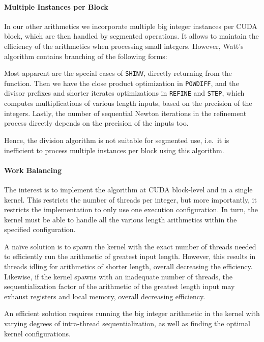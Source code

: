 \paragraph{Multiple Instances per Block}
In our other arithmetics we incorporate multiple big integer instances per CUDA
block, which are then handled by segmented operations. It allows to maintain the
efficiency of the arithmetics when processing small integers. However, Watt's
algorithm contains branching of the following forms:

Most apparent are the special cases of \texttt{SHINV}, directly returning from
the function. Then we have the close product optimization in \texttt{POWDIFF},
and the divisor prefixes and shorter iterates optimizations in \texttt{REFINE}
and \texttt{STEP}, which computes multiplications of various length inputs,
based on the precision of the integers. Lastly, the number of sequential Newton
iterations in the refinement process directly depends on the precision of the
inputs too.

Hence, the division algorithm is not suitable for segmented use, i.e.\ it is
inefficient to process multiple instances per block using this algorithm.

\paragraph{Work Balancing}
The interest is to implement the algorithm at CUDA block-level and in a single
kernel. This restricts the number of threads per integer, but more importantly,
it restricts the implementation to only use one execution configuration. In
turn, the kernel must be able to handle all the various length arithmetics
within the specified configuration.

A naïve solution is to spawn the kernel with the exact number of threads needed
to efficiently run the arithmetic of greatest input length. However, this
results in threads idling for arithmetics of shorter length, overall decreasing
the efficiency. Likewise, if the kernel spawns with an inadequate number of
threads, the sequentialization factor of the arithmetic of the greatest length
input may exhaust registers and local memory, overall decreasing efficiency.

An efficient solution requires running the big integer arithmetic in the kernel
with varying degrees of intra-thread sequentialization, as well as finding the
optimal kernel configurations.


